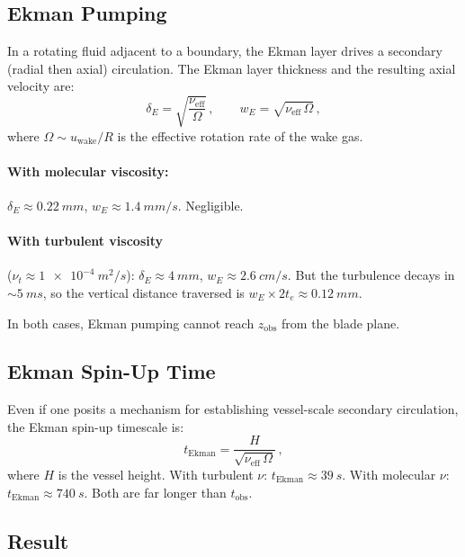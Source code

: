 \documentclass[11pt,a4paper]{article}
\begin{document}
\subsection{Ekman Pumping}

In a rotating fluid adjacent to a boundary, the Ekman layer drives a
secondary (radial then axial) circulation. The Ekman layer thickness
and the resulting axial velocity are:
\begin{equation}
  \delta_E = \sqrt{\frac{\nu_\mathrm{eff}}{\Omega}}\,,
  \qquad
  w_E = \sqrt{\nu_\mathrm{eff}\,\Omega}\,,
  \label{eq:Ekman}
\end{equation}
where $\Omega \sim u_\mathrm{wake}/R$ is the effective rotation rate of
the wake gas.

\paragraph{With molecular viscosity:}
$\delta_E \approx \SI{0.22}{mm}$, $w_E \approx \SI{1.4}{mm/s}$.
Negligible.

\paragraph{With turbulent viscosity} ($\nu_t \approx \SI{1e-4}{m^2/s}$):
$\delta_E \approx \SI{4}{mm}$, $w_E \approx \SI{2.6}{cm/s}$. But the
turbulence decays in $\sim\SI{5}{ms}$, so the vertical distance
traversed is $w_E \times 2 t_e \approx \SI{0.12}{mm}$.

In both cases, Ekman pumping cannot reach $z_\mathrm{obs}$ from the
blade plane.

\subsection{Ekman Spin-Up Time}

Even if one posits a mechanism for establishing vessel-scale secondary
circulation, the Ekman spin-up timescale is:
\begin{equation}
  t_\mathrm{Ekman} = \frac{H}{\sqrt{\nu_\mathrm{eff}\,\Omega}}\,,
  \label{eq:tEkman}
\end{equation}
where $H$ is the vessel height. With turbulent $\nu$:
$t_\mathrm{Ekman} \approx \SI{39}{s}$. With molecular $\nu$:
$t_\mathrm{Ekman} \approx \SI{740}{s}$. Both are far longer than
$t_\mathrm{obs}$.

\subsection{Result}
\end{document}
